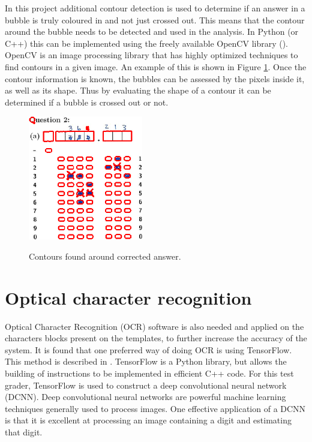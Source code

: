 In this project additional contour detection is used to determine if an answer in a bubble is truly coloured in and not just crossed out. This means that the contour around the bubble needs to be detected and used in the analysis. In Python (or C++) this can be implemented using the freely available OpenCV library (\citet{AdrianR2016}). OpenCV is an image processing library that has highly optimized techniques to find contours in a given image. An example of this is shown in Figure \ref{fig:Cross}. Once the contour information is known, the bubbles can be assessed by the pixels inside it, as well as its shape. Thus by evaluating the shape of a contour it can be determined if a bubble is crossed out or not.
\begin{figure}
  \centering
  \includegraphics[width=5cm]{Cross}\\
  \caption{Contours found around corrected answer.}
  \label{fig:Cross}
\end{figure}

\section{Optical character recognition}
Optical Character Recognition (OCR) software is also needed and applied on the characters blocks present on the templates, to further increase the accuracy of the system. It is found that one preferred way of doing OCR is using TensorFlow. This method is described in \citet{Tensor}. TensorFlow is a Python library, but allows the building of instructions to be implemented in ef{f}icient C++ code. For this test grader, TensorFlow is used to construct a deep convolutional neural network (DCNN). Deep convolutional neural networks are powerful machine learning techniques generally used to process images. One effective application of a DCNN is that it is excellent at processing an image containing a digit and estimating that digit.

